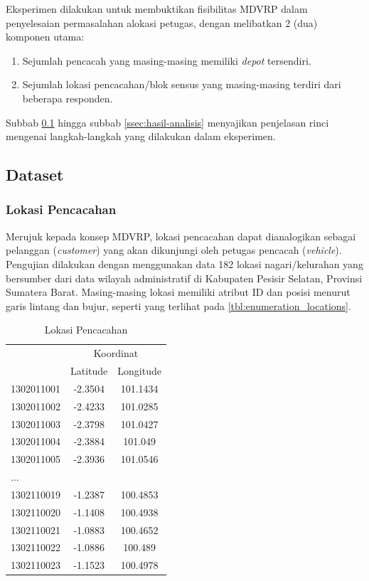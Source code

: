 Eksperimen dilakukan untuk membuktikan fisibilitas MDVRP dalam penyelesaian permasalahan alokasi petugas, dengan melibatkan 2 (dua) komponen utama:
\begin{enumerate}
	\item Sejumlah pencacah yang masing-masing memiliki \textit{depot} tersendiri. 
	\item Sejumlah lokasi pencacahan/blok sensus yang masing-masing terdiri dari beberapa responden. 
\end{enumerate}

Subbab \ref{ssec:mtsp_dataset} hingga subbab \ref{ssec:hasil-analisis} menyajikan penjelasan rinci mengenai langkah-langkah yang dilakukan dalam eksperimen. 

\subsection{Dataset}
\label{ssec:mtsp_dataset}
\subsubsection{Lokasi Pencacahan}
Merujuk kepada konsep MDVRP, lokasi pencacahan dapat dianalogikan sebagai pelanggan (\textit{customer}) yang akan dikunjungi oleh petugas pencacah (\textit{vehicle}). Pengujian dilakukan dengan menggunakan data 182 lokasi nagari/kelurahan yang bersumber dari data wilayah administratif di Kabupaten Pesisir Selatan, Provinsi Sumatera Barat. Masing-masing lokasi memiliki atribut ID dan posisi menurut garis lintang dan bujur, seperti yang terlihat pada \autoref{tbl:enumeration_locations}.


\begin{table}[!]
	\centering
	\caption{Lokasi Pencacahan}
	\label{tbl:enumeration_locations}
	\begin{tabular}{lcc}
		\toprule
		& \multicolumn{2}{c}{Koordinat}\\
		\cmidrule{2-3}
		& Latitude & Longitude\\ 
		\midrule
		1302011001 & -2.3504 & 101.1434\\ 
		1302011002 & -2.4233 & 101.0285\\ 
		1302011003 & -2.3798 & 101.0427\\ 
		1302011004 & -2.3884 & 101.049\\ 
		1302011005 & -2.3936 & 101.0546\\
		...\\
		1302110019 & -1.2387 & 100.4853\\ 
		1302110020 & -1.1408 & 100.4938\\ 
		1302110021 & -1.0883 & 100.4652\\ 
		1302110022 & -1.0886 & 100.489\\ 
		1302110023 & -1.1523 & 100.4978\\
		\bottomrule
	\end{tabular}
\end{table}


